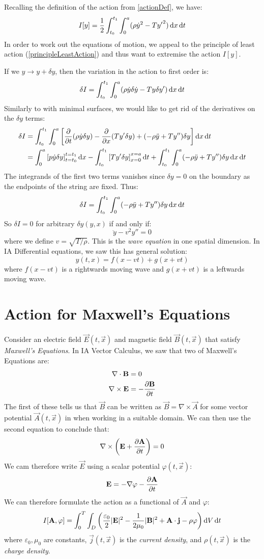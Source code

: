 \documentclass[../main.tex]{subfiles}
\begin{document}
Recalling the definition of the action from \cref{actionDef}, we have:
\[
  I[y] = \frac{1}{2} \int_{t_0}^{t_1} \int_{0}^{a} (\rho \dot{y}^2  - T{y'}^2) \d{x} \d{t}
\]
In order to work out the equations of motion, we appeal to the principle of least action (\cref{principleLeastAction}) and thus want to extremise the action $I[y]$.

If we $y \to y + \delta y$, then the variation in the action to first order is:
\[
  \delta I = \int_{t_0}^{t_1} \int_{0}^{a} (\rho \dot{y} \delta \dot{y} - T y \delta y') \d{x} \d{t}
\]
Similarly to with minimal surfaces, we would like to get rid of the derivatives on the $\delta y$ terms:
\begin{align*}
  \delta I &= \int_{t_0}^{t_1} \int_{0}^{a} \left[\pderiv{}{t}(\rho \dot{y} \delta y) - \pderiv{}{x}(Ty'\delta y) + (-\rho \ddot{y} + Ty'')\delta y\right] \d{x} \d{t} \\
           &= \int_{0}^{a} \eval{p \dot{y} \delta y}{t = t_0}{t = t_1} \d{x} - \int_{t_0}^{t_1} \eval{T y' \delta y}{x = 0}{x = a} \d{t} + \int_{t_0}^{t_1} \int_{0}^{a} (-\rho \ddot{y} + Ty'')\delta y \d{x} \d{t}
\end{align*}
The integrands of the first two terms vanishes since $\delta y = 0$ on the boundary as the endpoints of the string are fixed.
Thus:
\[
  \delta I = \int_{t_0}^{t_1} \int_{0}^{a} (-\rho \ddot{y} + Ty'')\delta y \d{x} \d{t}
\]
So $\delta I = 0$ for arbitrary $\delta y(y, x)$ if and only if:
\[
  \ddot{y} - v^2 y'' = 0
\]
where we define $v = \sqrt{T/\rho}$.
This is the \textit{wave equation} in one spatial dimension.
In IA Differential equations, we saw this has general solution:
\[
  y(t, x) = f(x - vt) + g(x + vt)
\]
where $f(x - vt)$ is a rightwards moving wave and $g(x + vt)$ is a leftwards moving wave.
\section{Action for Maxwell's Equations}
Consider an electric field $\vec{E}(t, \vec{x})$ and magnetic field $\vec{B}(t, \vec{x})$ that satisfy \textit{Maxwell's Equations}.
In IA Vector Calculus, we saw that two of Maxwell's Equations are:
\begin{align*}
  \nabla \cdot \vec{B} &= 0 \\
  \nabla \times \vec{E} &= - \pderiv{\vec{B}}{t}
\end{align*}
The first of these tells us that $\vec{B}$ can be written as $\vec{B} = \nabla \times \vec{A}$ for some vector potential $\vec{A}(t, \vec{x})$ in when working in a suitable domain.
We can then use the second equation to conclude that:
\[
  \nabla \times \left(\vec{E} + \pderiv{\vec{A}}{t}\right) = 0
\]
We cam therefore write $\vec{E}$ using a scalar potential $\varphi(t, \vec{x})$:
\[
  \vec{E} = - \nabla \varphi - \pderiv{\vec{A}}{t}
\]
We can therefore formulate the action as a functional of $\vec{A}$ and $\varphi$:
\[
  I[\vec{A}, \varphi] = \int_{0}^{T} \int_{D} \left(\frac{\varepsilon_0}{2} |\vec{E}|^2 - \frac{1}{2\mu_0}|\vec{B}|^2 + \vec{A} \cdot \vec{j} - \rho \varphi\right) \d{V} \d{t}
\]
where $\varepsilon_0, \mu_0$ are constants, $\vec{j}(t, \vec{x})$ is the \textit{current density}, and $\rho(t, \vec{x})$ is the \textit{charge density}.
\end{document}
